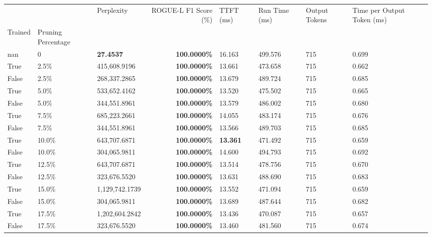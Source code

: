 \begin{table}[H]
\label{tab:evaluation-pipeline-2}
\begin{tabular}{lllrllll}
\toprule
 &  & Perplexity & ROGUE-L F1 Score (\%) & TTFT (ms) & Run Time (ms) & Output Tokens & Time per Output Token (ms) \\
Trained & Pruning Percentage &  &  &  &  &  &  \\
\midrule
nan & 0 & \bfseries 27.4537 & \bfseries 100.0000\% & 16.163 & 499.576 & 715 & 0.699 \\
\cline{1-8}
True & 2.5\% & 415,608.9196 & \bfseries \color{red} 100.0000\% & 13.661 & 473.658 & 715 & 0.662 \\
\cline{1-8}
False & 2.5\% & \color{red} 268,337.2865 & \bfseries \color{red} 100.0000\% & 13.679 & 489.724 & 715 & 0.685 \\
\cline{1-8}
True & 5.0\% & 533,652.4162 & \bfseries \color{red} 100.0000\% & 13.520 & 475.502 & 715 & 0.665 \\
\cline{1-8}
False & 5.0\% & 344,551.8961 & \bfseries \color{red} 100.0000\% & 13.579 & 486.002 & 715 & 0.680 \\
\cline{1-8}
True & 7.5\% & 685,223.2661 & \bfseries \color{red} 100.0000\% & 14.055 & 483.174 & 715 & 0.676 \\
\cline{1-8}
False & 7.5\% & 344,551.8961 & \bfseries \color{red} 100.0000\% & 13.566 & 489.703 & 715 & 0.685 \\
\cline{1-8}
True & 10.0\% & 643,707.6871 & \bfseries \color{red} 100.0000\% & \bfseries \color{red} 13.361 & 471.492 & 715 & 0.659 \\
\cline{1-8}
False & 10.0\% & 304,065.9811 & \bfseries \color{red} 100.0000\% & 14.600 & 494.793 & 715 & 0.692 \\
\cline{1-8}
True & 12.5\% & 643,707.6871 & \bfseries \color{red} 100.0000\% & 13.514 & 478.756 & 715 & 0.670 \\
\cline{1-8}
False & 12.5\% & 323,676.5520 & \bfseries \color{red} 100.0000\% & 13.631 & 488.690 & 715 & 0.683 \\
\cline{1-8}
True & 15.0\% & 1,129,742.1739 & \bfseries \color{red} 100.0000\% & 13.552 & 471.094 & 715 & 0.659 \\
\cline{1-8}
False & 15.0\% & 304,065.9811 & \bfseries \color{red} 100.0000\% & 13.689 & 487.644 & 715 & 0.682 \\
\cline{1-8}
True & 17.5\% & 1,202,604.2842 & \bfseries \color{red} 100.0000\% & 13.436 & 470.087 & 715 & 0.657 \\
\cline{1-8}
False & 17.5\% & 323,676.5520 & \bfseries \color{red} 100.0000\% & 13.460 & 481.560 & 715 & 0.674 \\

\end{tabular}
\end{table}
